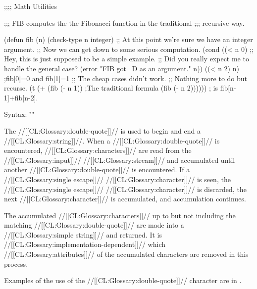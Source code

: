\endsubsubsubsection%


\code ;;;; Math Utilities

;;; FIB computes the the Fibonacci function in the traditional ;;; recursive way.

(defun fib (n)
  (check-type n integer)
  ;; At this point we're sure we have an integer argument.
  ;; Now we can get down to some serious computation.
  (cond ((< n 0)
         ;; Hey, this is just supposed to be a simple example.
         ;; Did you really expect me to handle the general case?
         (error "FIB got ~D as an argument." n))
        ((< n 2) n)             ;fib[0]=0 and fib[1]=1
        ;; The cheap cases didn't work.
        ;; Nothing more to do but recurse.
        (t (+ (fib (- n 1))     ;The traditional formula
              (fib (- n 2)))))) ; is fib[n-1]+fib[n-2]. \endcode

\endsubsubsubsection%

\endsubsubsection%

\endsubsection%

  

\b{Syntax:} \f{""}

The //[[CL:Glossary:double-quote]]// is used to begin and end a //[[CL:Glossary:string]]//. When a //[[CL:Glossary:double-quote]]// is encountered, //[[CL:Glossary:characters]]// are read from the //[[CL:Glossary:input]]// //[[CL:Glossary:stream]]//  and accumulated until another //[[CL:Glossary:double-quote]]// is encountered. If a //[[CL:Glossary:single escape]]// //[[CL:Glossary:character]]// is seen, the //[[CL:Glossary:single escape]]// //[[CL:Glossary:character]]// is discarded, the next //[[CL:Glossary:character]]// is accumulated, and accumulation continues.

The accumulated //[[CL:Glossary:characters]]//  up to but not including the matching //[[CL:Glossary:double-quote]]//  are made into a //[[CL:Glossary:simple string]]// and returned.  It is //[[CL:Glossary:implementation-dependent]]// which //[[CL:Glossary:attributes]]// of the accumulated characters are removed in this process.

Examples of the use of the //[[CL:Glossary:double-quote]]// character are in \thenextfigure. 

